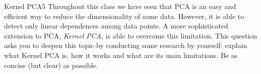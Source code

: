 \begin{questions}
\begin{question}[bonus]{Kernel PCA}{5}
Throughout this class we have seen that PCA is an easy and efficient way to reduce the dimensionality of some data. However, it is able to detect only linear dependences among data points. A more sophisticated extension to PCA, \emph{Kernel PCA}, is able to overcome this limitation. 
This question asks you to deepen this topic by conducting some research by yourself: explain what Kernel PCA is, how it works and what are its main limitations. Be as concise (but clear) as possible.

\begin{answer}\end{answer}
\end{question}

\end{questions}
